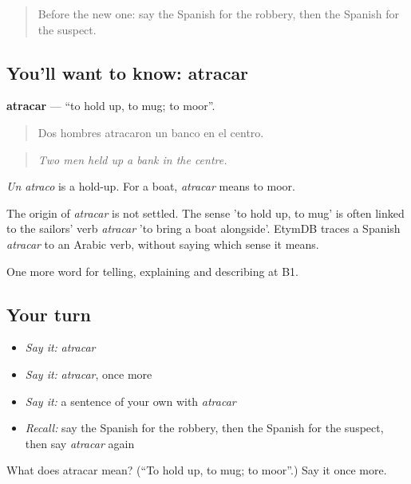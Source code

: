 \begin{quote}
Before the new one: say the Spanish for the robbery, then the Spanish for the suspect.
\end{quote}

\subsection*{You'll want to know: atracar}
\textbf{atracar} — \textquotedblleft{}to hold up, to mug; to moor\textquotedblright{}.

\begin{quote}
Dos hombres atracaron un banco en el centro.
\end{quote}

\begin{quote}
\emph{Two men held up a bank in the centre.}
\end{quote}

\emph{Un atraco} is a hold-up. For a boat, \emph{atracar} means to moor.

\begin{cousinweb}
The origin of \emph{atracar} is not settled. The sense 'to hold up, to mug' is often linked to the sailors' verb \emph{atracar} 'to bring a boat alongside'. EtymDB traces a Spanish \emph{atracar} to an Arabic verb, without saying which sense it means.
\end{cousinweb}

\begin{grammarlens}[title={What you've built}]
One more word for telling, explaining and describing at B1.
\end{grammarlens}

\subsection*{Your turn}
\begin{itemize}
\raggedright
  \item \emph{Say it:} \emph{atracar}
  \item \emph{Say it:} \emph{atracar}, once more
  \item \emph{Say it:} a sentence of your own with \emph{atracar}
  \item \emph{Recall:} say the Spanish for the robbery, then the Spanish for the suspect, then say \emph{atracar} again
\end{itemize}

\begin{tcolorbox}[breakable,colback=teal!4,colframe=teal!35!black,title={Before you move on}]
What does atracar mean? (\textquotedblleft{}To hold up, to mug; to moor\textquotedblright{}.) Say it once more.
\end{tcolorbox}
